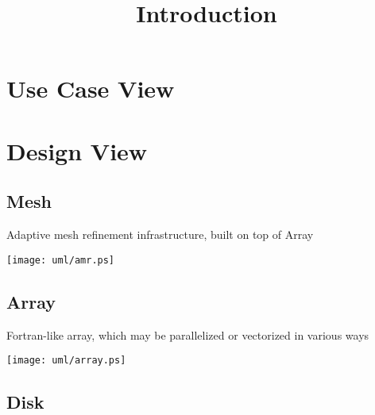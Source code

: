 \documentclass{book}
\begin{document}

\tableofcontents

\title{Introduction} \label{s:intro}


\chapter{Use Case View}

\chapter{Design View}


\section{Mesh}

Adaptive mesh refinement infrastructure, built on top of Array

\centerline{\texttt{[image: uml/amr.ps]}}

\section{Array}

Fortran-like array, which may be parallelized or vectorized in various
ways

\centerline{\texttt{[image: uml/array.ps]}}

\section{Disk}
\end{document}
